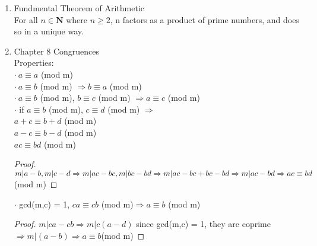 \documentclass[10pt]{article}
\newcommand{\Nb}{\mathbf{N}}
\begin{document}
\begin{multicols}{2}
\begin{enumerate}
	Thm1: gcd(m,n) = 1, $m|nc\Rightarrow m|c$
	\begin{proof}
		$\exists x_0,y_0$ s.t. $mx_0+ny_0 = 1$\\
		Then $mx_0c + ny_0c = c$\\
		$m|nc \Rightarrow m|(mx_0c + ny_0c)\Rightarrow m|c$
	\end{proof}
	Thm2: suppose p is prime, $p|ab \Rightarrow p|a$ or $p|b$
	\begin{proof}
		if $p|a$, this is true.
		if $p\nmid a$, then gcd(p,a) = 1 since p is prime.\\
		Then $p|ab \Rightarrow p|b$
	\end{proof}
	Thm3: all solutions to $ax + by = gcd(a,b)$\\
	we can find $ax_0 + by_0 = gcd(a,b)$ by Euclidean algorithm.\\
	Then we have $ax+by = ax_0 + by_0 = gcd(a,b)$\\
	Then $a(x_0-x) + b(y_0-y) = 0\Rightarrow a(x_0 - x) = b(y-y_0)$\\
	Divides both sides by gcd(a,b)\\
	$\frac{a(x_0-x)}{gcd(a,b)} = \frac{b(y-y_0)}{gcd(a,b)}$\\
	$\Rightarrow \frac{a}{gcd(a,b)}|\frac{b}{gcd(a,b)}\cdot (y-y_0)$\\
	 since $\frac{a}{gcd(a,b)},\frac{b}{gcd(a,b)}$ are co-prime $\Rightarrow \frac{a}{gcd(a,b)} | y-y_0$\\
	 $y = y_0 + k \frac{a}{gcd(a,b)}$\\
	 similarly, $x = x_0 - k \frac{b}{gcd(a,b)}$, where k are the same.
	
	\item Fundmental Theorem of Arithmetic\\
	For all $n \in \Nb$ where $n \ge 2$, n factors as a product of prime numbers, and does so in a unique way.

	\item Chapter 8 Congruences\\
	Properties:\\
	$\cdot \ a \equiv a$ (mod m)\\
	$\cdot \ a \equiv b$ (mod m) $\Rightarrow b \equiv a$ (mod m)\\
	$\cdot \ a \equiv b$ (mod m),  $b \equiv c$ (mod m) $\Rightarrow a \equiv c$ (mod m)\\
	$\cdot$ if $a \equiv b$ (mod m),  $c \equiv d$ (mod m) $\Rightarrow$\\
	$a+c \equiv b+d$ (mod m)\\
	$a-c \equiv b-d$ (mod m)\\
	$ac \equiv bd$ (mod m)
	\begin{proof}
		$m|a-b, m|c-d \Rightarrow m|ac-bc, m|bc-bd\Rightarrow\\ m|ac-bc+bc-bd \Rightarrow m|ac-bd\Rightarrow ac\equiv bd$(mod m)
	\end{proof}
	$\cdot$ gcd(m,c) = 1, $ca \equiv cb$ (mod m)$\Rightarrow a \equiv b$ (mod m) 
	\begin{proof}
		$m|ca-cb\Rightarrow m|c(a-d)$ since gcd(m,c) = 1, they are coprime$\Rightarrow m|(a-b)\Rightarrow a\equiv b$(mod m)
	\end{proof}
		

\end{enumerate}
\end{multicols}
\end{document}
